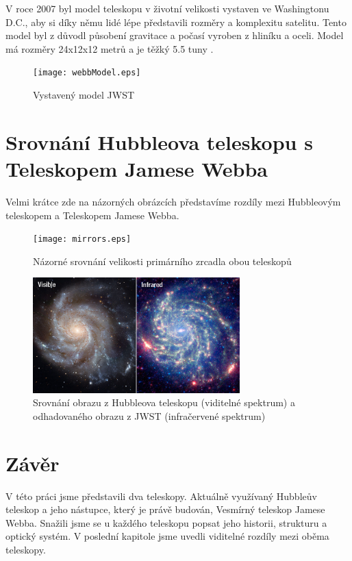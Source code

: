 \documentclass[a4paper,11pt]{article}
\begin{document}
V roce 2007 byl model teleskopu v životní velikosti vystaven ve Washingtonu D.C., aby si díky němu lidé lépe představili rozměry a komplexitu satelitu. Tento model byl z důvodl působení gravitace a počasí vyroben z hliníku a oceli. Model má rozměry 24x12x12 metrů a je těžký 5.5 tuny \cite{wikipediaWebbEn}.

\begin{figure}[h]
\begin{center}
\texttt{[image: webbModel.eps]}
\caption{Vystavený model JWST}
\end{center}
\end{figure}

\section{Srovnání Hubbleova teleskopu s Teleskopem Jamese Webba}
Velmi krátce zde na názorných obrázcích představíme rozdíly mezi Hubbleovým teleskopem a Teleskopem Jamese Webba.

\begin{figure}[h]
\begin{center}
\texttt{[image: mirrors.eps]}
\caption{Názorné srovnání velikosti primárního zrcadla obou teleskopů}
\end{center}
\end{figure}

\begin{figure}[h]
\begin{center}
\includegraphics[width=8cm]{compare.jpg}
\caption{Srovnání obrazu z Hubbleova teleskopu (viditelné spektrum) a odhadovaného obrazu z JWST (infračervené spektrum)}
\end{center}
\end{figure}

\section{Závěr}
V této práci jsme představili dva teleskopy. Aktuálně využívaný Hubbleův teleskop a jeho nástupce, který je právě budován, Vesmírný teleskop Jamese Webba. Snažili jsme se u každého teleskopu popsat jeho historii, strukturu a optický systém. V poslední kapitole jsme uvedli viditelné rozdíly mezi oběma teleskopy.
\newpage


\def\refname{Použitá literatura}

\end{document}
